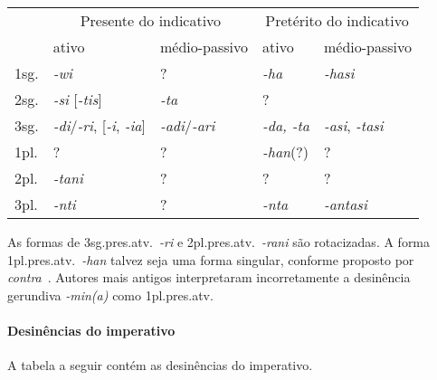 \begin{center}
	\begin{tabular}[c]{lll|ll}
		\toprule
		     & \multicolumn{2}{c|}{Presente do indicativo}           & \multicolumn{2}{c}{Pretérito do indicativo}                                                \\
		     & ativo                                                 & médio-passivo                               & ativo            & médio-passivo             \\
		\midrule
		1sg. & \emph{-wi}                                            & {?}                                         & \emph{-ha}       & \emph{-hasi}              \\
		2sg. & \emph{-si} [\emph{-tis}]                              & \emph{-ta}                                  & {?}              &                           \\
		3sg. & \emph{-di}\slash{}\emph{-ri}, [\emph{-i}, \emph{-ia}] & \emph{-adi}\slash{}\emph{-ari}              & \emph{-da, -ta}  & \emph{-asi}, \emph{-tasi} \\
		1pl. & {?}                                                   & {?}                                         & \emph{-han}{(?)} & {?}                       \\
		2pl. & \emph{-tani}                                          & {?}                                         & {?}              & {?}                       \\
		3pl. & \emph{-nti}                                           & {?}                                         & \emph{-nta}      & \emph{-antasi}            \\
		\bottomrule
	\end{tabular}
\end{center}

\noindent As formas de 3sg.pres.atv.\ \emph{-ri} e 2pl.pres.atv.\ \emph{-rani} são
rotacizadas. A forma 1pl.pres.atv.\ \emph{-han} talvez seja uma forma singular,
conforme proposto por~\citet{Carruba1984} \emph{contra}~\citet{MorpurgoDavies1980}.
Autores mais antigos interpretaram incorretamente a desinência
gerundiva \emph{-min{(a)}} como 1pl.pres.atv.

\paragraph{Desinências do imperativo}
A tabela a seguir contém as desinências do imperativo.

